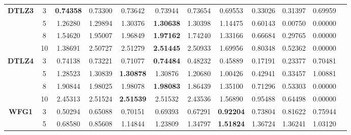\documentclass{sig-alternate}
\begin{document}
\begin{table*}[!htb]
\begin{tabular}{|c|c|c|c|c|c|c|c|c|c|c|c|}
\multirow{4}{*}{\textbf{DTLZ3}} & 3          & \textbf{0.74358} & 0.73300           & 0.73642               & 0.73944          & 0.73654             & 0.69553             & 0.33026            & 0.31397              & 0.69959          \\ \cline{2-11} 
& 5          & 1.26280          & 1.29894           & 1.30376               & \textbf{1.30638} & 1.30398             & 1.14475             & 0.60143            & 0.00750              & 0.00000          \\ \cline{2-11} 
& 8          & 1.54620          & 1.95007           & 1.96849               & \textbf{1.97162} & 1.74240             & 1.33166             & 0.66684            & 0.29765              & 0.00000          \\ \cline{2-11} 
& 10         & 1.38691          & 2.50727           & 2.51279               & \textbf{2.51445} & 2.50933             & 1.69956             & 0.80348            & 0.52362              & 0.00000          \\ \hline
\multirow{4}{*}{\textbf{DTLZ4}} & 3          & 0.74138          & 0.73221           & 0.71077               & \textbf{0.74484} & 0.48232             & 0.45889             & 0.17191            & 0.23377              & 0.70481          \\ \cline{2-11} 
& 5          & 1.28523          & 1.30839           & \textbf{1.30878}      & 1.30876          & 1.20680             & 1.00426             & 0.42941            & 0.33457              & 1.00881          \\ \cline{2-11} 
& 8          & 1.90844          & 1.98025           & 1.98078               & \textbf{1.98083} & 1.86439             & 1.35100             & 0.71296            & 0.53303              & 0.00000          \\ \cline{2-11} 
& 10         & 2.45313          & 2.51524           & \textbf{2.51539}      & 2.51532          & 2.43536             & 1.56890             & 0.95488            & 0.64498              & 0.00000          \\ \hline
\multirow{4}{*}{\textbf{WFG1}}  & 3          & 0.50294          & 0.65088           & 0.70151               & 0.69393          & 0.67291             & \textbf{0.92204}    & 0.73804            & 0.81622              & 0.75944          \\ \cline{2-11} 
& 5          & 0.68580          & 0.85608           & 1.14844               & 1.23809          & 1.34797             & \textbf{1.51824}    & 1.36724            & 1.36241              & 1.03120          \\ \cline{2-11} 

\end{tabular}
\end{table*}
\end{document}

